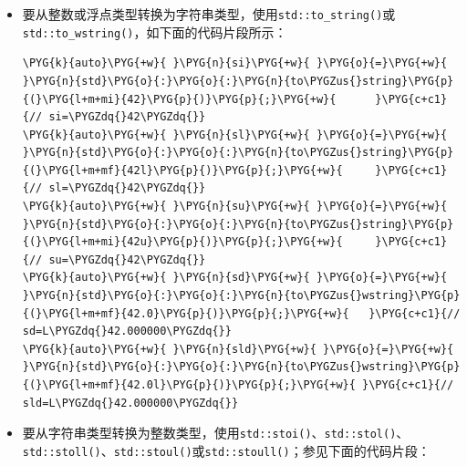 \begin{itemize}
\item 要从整数或浮点类型转换为字符串类型，使用\texttt{std::\allowbreak{}to\_\allowbreak{}string()}或\texttt{std::\allowbreak{}to\_\allowbreak{}wstring()}，如下面的代码片段所示：



\begin{codeblockbg}
\begin{Verbatim}[commandchars=\\\{\},breaklines=true,breakanywhere=true,fontsize=\codefont,xleftmargin=17bp]
\PYG{k}{auto}\PYG{+w}{ }\PYG{n}{si}\PYG{+w}{ }\PYG{o}{=}\PYG{+w}{ }\PYG{n}{std}\PYG{o}{:}\PYG{o}{:}\PYG{n}{to\PYGZus{}string}\PYG{p}{(}\PYG{l+m+mi}{42}\PYG{p}{)}\PYG{p}{;}\PYG{+w}{      }\PYG{c+c1}{// si=\PYGZdq{}42\PYGZdq{}}
\PYG{k}{auto}\PYG{+w}{ }\PYG{n}{sl}\PYG{+w}{ }\PYG{o}{=}\PYG{+w}{ }\PYG{n}{std}\PYG{o}{:}\PYG{o}{:}\PYG{n}{to\PYGZus{}string}\PYG{p}{(}\PYG{l+m+mf}{42l}\PYG{p}{)}\PYG{p}{;}\PYG{+w}{     }\PYG{c+c1}{// sl=\PYGZdq{}42\PYGZdq{}}
\PYG{k}{auto}\PYG{+w}{ }\PYG{n}{su}\PYG{+w}{ }\PYG{o}{=}\PYG{+w}{ }\PYG{n}{std}\PYG{o}{:}\PYG{o}{:}\PYG{n}{to\PYGZus{}string}\PYG{p}{(}\PYG{l+m+mi}{42u}\PYG{p}{)}\PYG{p}{;}\PYG{+w}{     }\PYG{c+c1}{// su=\PYGZdq{}42\PYGZdq{}}
\PYG{k}{auto}\PYG{+w}{ }\PYG{n}{sd}\PYG{+w}{ }\PYG{o}{=}\PYG{+w}{ }\PYG{n}{std}\PYG{o}{:}\PYG{o}{:}\PYG{n}{to\PYGZus{}wstring}\PYG{p}{(}\PYG{l+m+mf}{42.0}\PYG{p}{)}\PYG{p}{;}\PYG{+w}{   }\PYG{c+c1}{// sd=L\PYGZdq{}42.000000\PYGZdq{}}
\PYG{k}{auto}\PYG{+w}{ }\PYG{n}{sld}\PYG{+w}{ }\PYG{o}{=}\PYG{+w}{ }\PYG{n}{std}\PYG{o}{:}\PYG{o}{:}\PYG{n}{to\PYGZus{}wstring}\PYG{p}{(}\PYG{l+m+mf}{42.0l}\PYG{p}{)}\PYG{p}{;}\PYG{+w}{ }\PYG{c+c1}{// sld=L\PYGZdq{}42.000000\PYGZdq{}}
\end{Verbatim}
\end{codeblockbg}



\item 要从字符串类型转换为整数类型，使用\texttt{std::\allowbreak{}stoi()}、\texttt{std::\allowbreak{}stol()}、\texttt{std::\allowbreak{}stoll()}、\texttt{std::\allowbreak{}stoul()}或\texttt{std::\allowbreak{}stoull()}；参见下面的代码片段：




\end{itemize}
